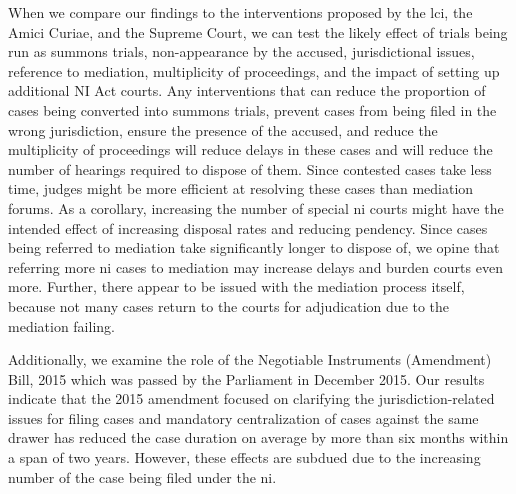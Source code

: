 \documentclass[12pt,a4paper]{article}
\begin{document}
	When we compare our findings to the interventions proposed by the \gls{lci}, the Amici Curiae, and the Supreme Court, we can test the likely effect of trials being run as summons trials, non-appearance by the accused, jurisdictional issues, reference to mediation, multiplicity of proceedings, and the impact of setting up additional NI Act courts. Any interventions that can reduce the proportion of cases being converted into summons trials, prevent cases from being filed in the wrong jurisdiction, ensure the presence of the accused, and reduce the multiplicity of proceedings will reduce delays in these cases and will reduce the number of hearings required to dispose of them. Since contested cases take less time, judges might be more efficient at resolving these cases than mediation forums. As a corollary, increasing the number of special \gls{ni} courts might have the intended effect of increasing disposal rates and reducing pendency. Since cases being referred to mediation take significantly longer to dispose of, we opine that referring more \gls{ni} cases to mediation may increase delays and burden courts even more. Further, there appear to be issued with the mediation process itself, because not many cases return to the courts for adjudication due to the mediation failing.
	
	Additionally, we examine the role of the Negotiable Instruments (Amendment) Bill, 2015 which was passed by the Parliament in December 2015. Our results indicate that the 2015 amendment focused on clarifying the jurisdiction-related issues for filing cases and mandatory centralization of cases against the same drawer has reduced the case duration on average by more than six months within a span of two years. However, these effects are subdued due to the increasing number of the case being filed under the \gls{ni}.
	
	
\end{document}
